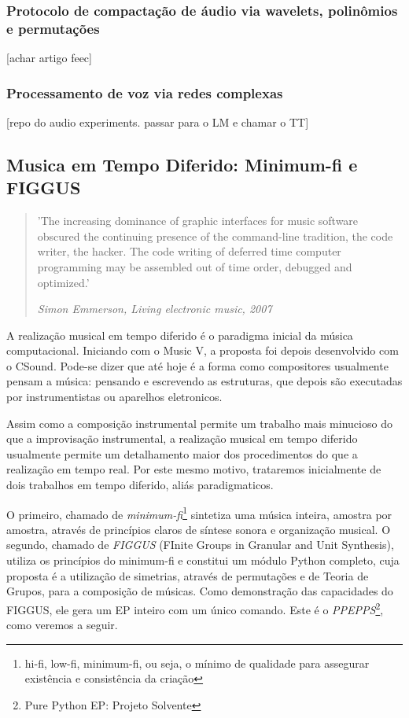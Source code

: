       \subsubsection{Protocolo de compactação de áudio via wavelets, polinômios e permutações}
      [achar artigo feec]


      \subsubsection{Processamento de voz via redes complexas}
      [repo do audio experiments. passar para o LM e chamar o TT]
  



  \subsection{Musica em Tempo Diferido: Minimum-fi e FIGGUS}

\begin{quotation}
\small
'The increasing dominance of graphic interfaces for music software obscured 
the continuing presence of the command-line tradition, 
the code writer, the hacker. The code writing of deferred time 
computer programming may be assembled out of time order, debugged and optimized.'

\emph{Simon Emmerson, Living electronic music, 2007}
\end{quotation}

A realização musical em tempo diferido é o paradigma inicial da música computacional.
Iniciando com o Music V, a proposta foi depois desenvolvido com o CSound. Pode-se dizer
que até hoje é a forma como compositores usualmente pensam a música: pensando
e escrevendo as estruturas, que depois são executadas por instrumentistas ou aparelhos eletronicos.

Assim como a composição instrumental permite um trabalho mais minucioso do que
a improvisação instrumental, a realização musical em tempo diferido usualmente permite um
detalhamento maior dos procedimentos do que a realização em tempo real. Por este
mesmo motivo, trataremos inicialmente de dois trabalhos em tempo diferido,
aliás paradigmaticos.

O primeiro, chamado de \emph{minimum-fi}\footnote{hi-fi, low-fi, minimum-fi, ou seja,
o mínimo de qualidade para assegurar existência e consistência
da criação} sintetiza uma música inteira, amostra por amostra, através de princípios
claros de síntese sonora e organização musical. O segundo, chamado de \emph{FIGGUS} (FInite
Groups in Granular and Unit Synthesis), utiliza os princípios do minimum-fi e constitui
um módulo Python completo, cuja proposta é a utilização de simetrias, através de
permutações e de Teoria de Grupos, para a composição de músicas. Como demonstração
das capacidades do FIGGUS, ele gera um EP inteiro com um único comando. Este é o
\emph{PPEPPS}\footnote{Pure Python EP: Projeto Solvente}, como veremos a seguir.

